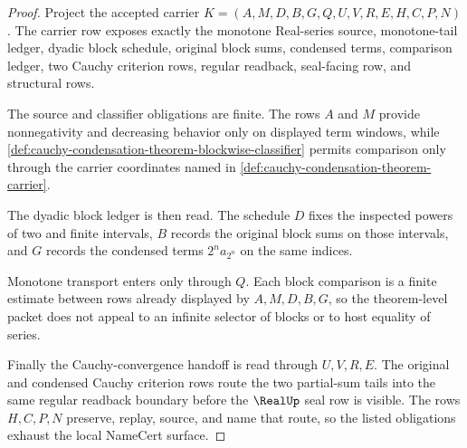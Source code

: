 \begin{proof}
Project the accepted carrier $K=(A,M,D,B,G,Q,U,V,R,E,H,C,P,N)$. The carrier row exposes exactly the monotone Real-series source, monotone-tail ledger, dyadic block schedule, original block sums, condensed terms, comparison ledger, two Cauchy criterion rows, regular readback, seal-facing row, and structural rows.

The source and classifier obligations are finite. The rows $A$ and $M$ provide nonnegativity and decreasing behavior only on displayed term windows, while \autoref{def:cauchy-condensation-theorem-blockwise-classifier} permits comparison only through the carrier coordinates named in \autoref{def:cauchy-condensation-theorem-carrier}.

The dyadic block ledger is then read. The schedule $D$ fixes the inspected powers of two and finite intervals, $B$ records the original block sums on those intervals, and $G$ records the condensed terms $2^n a_{2^n}$ on the same indices.

Monotone transport enters only through $Q$. Each block comparison is a finite estimate between rows already displayed by $A,M,D,B,G$, so the theorem-level packet does not appeal to an infinite selector of blocks or to host equality of series.

Finally the Cauchy-convergence handoff is read through $U,V,R,E$. The original and condensed Cauchy criterion rows route the two partial-sum tails into the same regular readback boundary before the $\RealUp$ seal row is visible. The rows $H,C,P,N$ preserve, replay, source, and name that route, so the listed obligations exhaust the local NameCert surface.
\end{proof}



